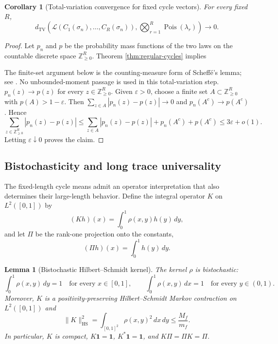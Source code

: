 \documentclass[11pt]{article}
\newtheorem{lemma}[theorem]{Lemma}
\newtheorem{corollary}[theorem]{Corollary}
\theoremstyle{remark}
\newcommand{\Zz}{\mathbb Z}
\newcommand{\one}{\mathbf 1}
\newcommand{\TV}{\mathrm{TV}}
\newcommand{\Pois}{\operatorname{Pois}}
\newcommand{\dd}{\,d}
\begin{document}
\begin{corollary}[Total-variation convergence for fixed cycle vectors]\label{cor:regular-cycles-tv}
For every fixed $R$,
\[
 d_{\TV}\!\left(
 \mathcal L(C_1(\sigma_n),\ldots,C_R(\sigma_n)),
 \bigotimes_{r=1}^R\Pois(\lambda_r)
 \right)\longrightarrow0.
\]
\end{corollary}

\begin{proof}
Let $p_n$ and $p$ be the probability mass functions of the two laws on the
countable discrete space $\Zz_{\ge0}^R$.  Theorem \ref{thm:regular-cycles} implies

The finite-set argument below is the counting-measure form of Scheff\'e's
lemma; see \cite{Billingsley1995}.  No unbounded-moment passage is used in
this total-variation step.
$p_n(z)\to p(z)$ for every $z\in\Zz_{\ge0}^R$.  Given $\varepsilon>0$, choose a
finite set $A\subset\Zz_{\ge0}^R$ with $p(A)>1-\varepsilon$.  Then
$\sum_{z\in A}|p_n(z)-p(z)|\to0$ and $p_n(A^c)\to p(A^c)$.  Hence
\[
 \sum_{z\in\Zz_{\ge0}^R}|p_n(z)-p(z)|
 \le \sum_{z\in A}|p_n(z)-p(z)|+p_n(A^c)+p(A^c)
 \le 3\varepsilon+o(1).
\]
Letting $\varepsilon\downarrow0$ proves the claim.
\end{proof}

\subsection{Bistochasticity and long trace universality}\label{subsec:long-traces}

The fixed-length cycle means admit an operator interpretation that also determines
their large-length behavior.  Define the integral operator $K$ on
$L^2([0,1])$ by
\[
        (Kh)(x)=\int_0^1\rho(x,y)h(y)\dd y,
\]
and let $\Pi$ be the rank-one projection onto the constants,
\[
        (\Pi h)(x)=\int_0^1h(y)\dd y.
\]

\begin{lemma}[Bistochastic Hilbert--Schmidt kernel]\label{lem:bistochastic-hs}
The kernel $\rho$ is bistochastic:
\[
        \int_0^1\rho(x,y)\dd y=1
        \quad\text{for every }x\in[0,1],
        \qquad
        \int_0^1\rho(x,y)\dd x=1
        \quad\text{for every }y\in(0,1).
\]
Moreover, $K$ is a positivity-preserving Hilbert--Schmidt Markov contraction on $L^2([0,1])$ and
\[
        \|K\|_{\mathrm{HS}}^2
        =\int_{[0,1]^2}\rho(x,y)^2\dd x\dd y
        \le \frac{M_f}{m_f}.
\]
In particular, $K$ is compact, $K\one=\one$, $K^*\one=\one$, and
$K\Pi=\Pi K=\Pi$.
\end{lemma}
\end{document}
